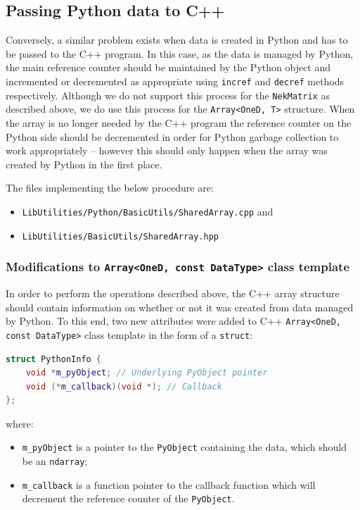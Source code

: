 \subsection{Passing Python data to C++} 

Conversely, a similar problem exists when data is created in Python and has to
be passed to the C++ program. In this case, as the data is managed by Python,
the main reference counter should be maintained by the Python object and
incremented or decremented as appropriate using \texttt{incref} and
\texttt{decref} methods respectively. Although we do not support this process
for the \texttt{NekMatrix} as described above, we do use this process for the
\texttt{Array<OneD, T>} structure. When the array is no longer needed by the C++
program the reference counter on the Python side should be decremented in order
for Python garbage collection to work appropriately -- however this should only
happen when the array was created by Python in the first place.

The files implementing the below procedure are:

\begin{itemize}
  \item \texttt{LibUtilities/Python/BasicUtils/SharedArray.cpp} and
  \item \texttt{LibUtilities/BasicUtils/SharedArray.hpp}
\end{itemize}

\subsubsection{Modifications to \texttt{Array<OneD, const DataType>} class template}

In order to perform the operations described above, the C++ array structure
should contain information on whether or not it was created from data managed by
Python. To this end, two new attributes were added to C++ \texttt{Array<OneD,
  const DataType>} class template in the form of a \texttt{struct}:

\begin{lstlisting}[language=C++]
struct PythonInfo {
    void *m_pyObject; // Underlying PyObject pointer
    void (*m_callback)(void *); // Callback
};
\end{lstlisting}

where:

\begin{itemize}
  \item \texttt{m\_pyObject} is a pointer to the \texttt{PyObject} containing
  the data, which should be an \texttt{ndarray};
  \item \texttt{m\_callback} is a function pointer to the callback function
  which will decrement the reference counter of the \texttt{PyObject}.
\end{itemize}

